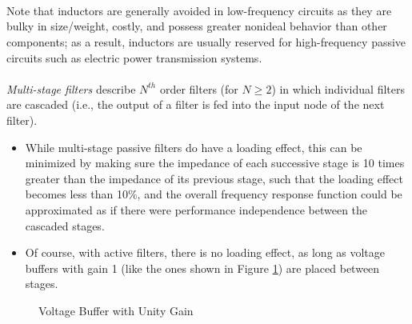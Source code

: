\documentclass{report}
\begin{document}
\\ \\ \\
Note that inductors are generally avoided in low-frequency circuits as they are bulky in size/weight, costly, and possess greater nonideal behavior than other components; as a result, inductors are usually reserved for high-frequency passive circuits such as 
electric power transmission systems. 
\\ \\
\emph{Multi-stage filters} describe $N^{th}$ order filters (for $N\geq 2$) in which individual filters are cascaded (i.e., the output of a filter is fed into the input node of the next filter). 
\begin{itemize}
    \item While multi-stage passive filters do have a loading effect, this can be minimized by making sure the impedance of each successive stage is 10 times greater than the impedance of its previous stage, such that the loading effect becomes less than 10\%, and the overall frequency response function could be approximated as if there were performance independence between the cascaded stages.
    \item Of course, with active filters, there is no loading effect, as long as voltage buffers with gain 1 (like the ones shown in Figure \ref{buffer}) are placed between stages.
\end{itemize}
\begin{figure}[!hbt]
    \centering
    \caption{Voltage Buffer with Unity Gain}
    \label{buffer}
\end{figure}
\end{document}
